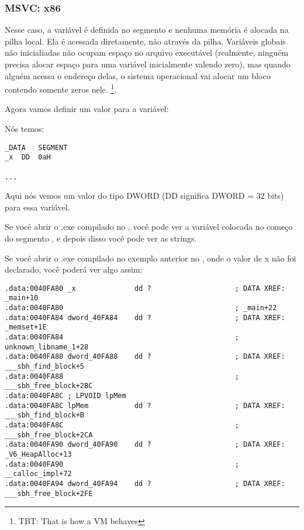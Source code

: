 \subsubsection{MSVC: x86}



Nesse caso, a variável  é definida no segmento  e nenhuma memória é alocada na pilha local.
Ela é acessada diretamente, não através da pilha.
Variáveis globais não inicialiadas não ocupam espaço no arquivo executável 
(realmente, ninguém precisa alocar espaço para uma variável inicialmente valendo zero), 
mas quando alguém acessa o endereço delas, o sistema operacional vai alocar um bloco contendo somente zeros nele.
\footnote{\ac{TBT}: That is how a \ac{VM} behaves}.

Agora vamos definir um valor para a variável:



Nós temos:

\begin{lstlisting}
_DATA	SEGMENT
_x	DD	0aH

...
\end{lstlisting}

Aqui nós vemos um valor  do tipo DWORD (DD significa DWORD = 32 bits) para essa variável.

Se você abrir o .exe compilado no \IDA, você pode ver a variável  colocada no começo do segmento ,
e depois disso você pode ver as strings.

Se você abrir o .exe compilado no exemplo anterior no \IDA, onde o valor de x não foi declarado, você poderá ver algo assim:

\begin{lstlisting}
.data:0040FA80 _x              dd ?                    ; DATA XREF: _main+10
.data:0040FA80                                         ; _main+22
.data:0040FA84 dword_40FA84    dd ?                    ; DATA XREF: _memset+1E
.data:0040FA84                                         ; unknown_libname_1+28
.data:0040FA88 dword_40FA88    dd ?                    ; DATA XREF: ___sbh_find_block+5
.data:0040FA88                                         ; ___sbh_free_block+2BC
.data:0040FA8C ; LPVOID lpMem
.data:0040FA8C lpMem           dd ?                    ; DATA XREF: ___sbh_find_block+B
.data:0040FA8C                                         ; ___sbh_free_block+2CA
.data:0040FA90 dword_40FA90    dd ?                    ; DATA XREF: _V6_HeapAlloc+13
.data:0040FA90                                         ; __calloc_impl+72
.data:0040FA94 dword_40FA94    dd ?                    ; DATA XREF: ___sbh_free_block+2FE
\end{lstlisting}

